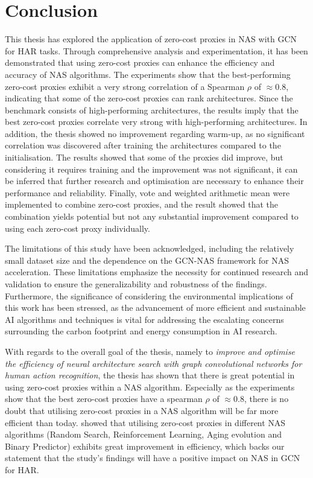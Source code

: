 \section{Conclusion}

This thesis has explored the application of zero-cost proxies in \gls{NAS} with \gls{GCN} for \gls{HAR} tasks. Through comprehensive analysis and experimentation, it has been demonstrated that using zero-cost proxies can enhance the efficiency and accuracy of \gls{NAS} algorithms. The experiments show that the best-performing zero-cost proxies exhibit a very strong correlation of a Spearman $\rho$ of $\approx 0.8$, indicating that some of the zero-cost proxies can rank architectures. Since the benchmark consists of high-performing architectures, the results imply that the best zero-cost proxies correlate very strong with high-performing architectures. In addition, the thesis showed no improvement regarding warm-up, as no significant correlation was discovered after training the architectures compared to the initialisation. The results showed that some of the proxies did improve, but considering it requires training and the improvement was not significant, it can be inferred that further research and optimisation are necessary to enhance their performance and reliability. Finally, vote and weighted arithmetic mean were implemented to combine zero-cost proxies, and the result showed that the combination yields potential but not any substantial improvement compared to using each zero-cost proxy individually. 
 

The limitations of this study have been acknowledged, including the relatively small dataset size and the dependence on the \gls{GCN}-\gls{NAS} framework for \gls{NAS} acceleration. These limitations emphasize the necessity for continued research and validation to ensure the generalizability and robustness of the findings. Furthermore, the significance of considering the environmental implications of this work has been stressed, as the advancement of more efficient and sustainable AI algorithms and techniques is vital for addressing the escalating concerns surrounding the carbon footprint and energy consumption in AI research.

With regards to the overall goal of the thesis, namely to \textit{improve and optimise the efficiency of neural architecture search with
graph convolutional networks for human action recognition}, the thesis has shown that there is great potential in using zero-cost proxies within a \gls{NAS} algorithm. Especially as the experiments show that the best zero-cost proxies have a spearman $\rho$ of $\approx 0.8$, there is no doubt that utilising zero-cost proxies in a \gls{NAS} algorithm will be far more efficient than today. \cite{abdelfattah2021zero} showed that utilising zero-cost proxies in different \gls{NAS} algorithms (Random Search, Reinforcement Learning, Aging evolution and Binary Predictor) exhibits great improvement in efficiency, which backs our statement that the study's findings will have a positive impact on \gls{NAS} in \gls{GCN} for \gls{HAR}.